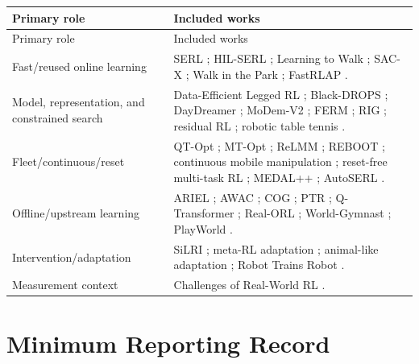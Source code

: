 \documentclass[11pt]{article}
\begin{document}
\begin{longtable}{p{}p{}}
\toprule
Primary role & Included works \\
\midrule
\endfirsthead
\toprule
Primary role & Included works \\
\midrule
\endhead
Fast/reused online learning &
SERL \cite{luo2024serl}; HIL-SERL \cite{luo2025hilserl}; Learning to Walk \cite{haarnoja2019walk}; SAC-X \cite{riedmiller2018sacx}; Walk in the Park \cite{wurss2023locality}; FastRLAP \cite{stachowicz2023fastrlap}. \\
\addlinespace
Model, representation, and constrained search &
Data-Efficient Legged RL \cite{yang2020dataefficientlegged}; Black-DROPS \cite{chatzilygeroudis2017blackdrops}; DayDreamer \cite{wu2023daydreamer}; MoDem-V2 \cite{lancaster2024modemv2}; FERM \cite{zhan2022ferm}; RIG \cite{nair2018rig}; residual RL \cite{johannink2019residual}; robotic table tennis \cite{tebbe2021tabletennis}. \\
\addlinespace
Fleet/continuous/reset &
QT-Opt \cite{kalashnikov2018qtopt}; MT-Opt \cite{kalashnikov2022mtopt}; ReLMM \cite{sun2022relmm}; REBOOT \cite{hu2023reboot}; continuous mobile manipulation \cite{mendonca2025continuous}; reset-free multi-task RL \cite{gupta2021resetfreemtl}; MEDAL++ \cite{sharma2023medalpp}; AutoSERL \cite{liu2026autoserl}. \\
\addlinespace
Offline/upstream learning &
ARIEL \cite{walke2023ariel}; AWAC \cite{nair2020awac}; COG \cite{singh2021cog}; PTR \cite{kumar2023ptr}; Q-Transformer \cite{chebotar2023qtransformer}; Real-ORL \cite{zhou2023realorl}; World-Gymnast \cite{sharma2026worldgymnast}; PlayWorld \cite{yin2026playworld}. \\
\addlinespace
Intervention/adaptation &
SiLRI \cite{zhao2025silri}; meta-RL adaptation \cite{nagabandi2019metarl}; animal-like adaptation \cite{cully2015adaptanimals}; Robot Trains Robot \cite{hu2025robottrainsrobot}. \\
\addlinespace
Measurement context &
Challenges of Real-World RL \cite{dulacarnold2019challenges,dulacarnold2021challenges}. \\
\bottomrule
\end{longtable}

\section{Minimum Reporting Record}
\end{document}
